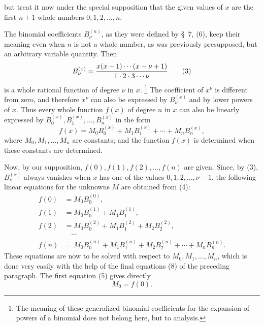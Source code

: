 
but treat it now under the special supposition that the given values of $x$ are the first $n+1$ whole numbers $0,1,2,\ldots,n$.

The binomial coefficients $B_\nu^{(n)}$, as they were defined by \S~7, (6), keep their meaning even when $n$ is not a whole number, as was previously presupposed, but an arbitrary variable quantity. Then
\begin{equation}
 B_\nu^{(x)}={x(x-1)\cdots(x-\nu+1)\over 1\cdot2\cdot3\cdots\nu}
\tag{3}
\end{equation}
is a whole rational function of degree $\nu$ in $x$.
\footnote{The meaning of these generalized binomial coefficients for the expansion of powers of a binomial does not belong here, but to analysis.}
The coefficient of $x^\nu$ is different from zero, and therefore $x^\nu$ can also be expressed by $B_\nu^{(x)}$ and by lower powers of $x$. Thus every whole function $f(x)$ of degree $n$ in $x$ can also be linearly expressed by $B_0^{(x)},B_1^{(x)},\ldots,B_n^{(x)}$ in the form
\begin{equation}
 f(x)=M_0B_0^{(x)}+M_1B_1^{(x)}+\cdots+M_nB_n^{(x)},
\tag{4}
\end{equation}
where $M_0,M_1,\ldots,M_n$ are constants; and the function $f(x)$ is determined when these constants are determined.

Now, by our supposition, $f(0),f(1),f(2),\ldots,f(n)$ are given. Since, by (3), $B_\nu^{(x)}$ always vanishes when $x$ has one of the values $0,1,2,\ldots,\nu-1$, the following linear equations for the unknowns $M$ are obtained from (4):
\begin{equation}
\begin{aligned}
 f(0)&=M_0B_0^{(0)},\\
 f(1)&=M_0B_0^{(1)}+M_1B_1^{(1)},\\
 f(2)&=M_0B_0^{(2)}+M_1B_1^{(2)}+M_2B_2^{(2)},\\
 &\quad\cdots\\
 f(n)&=M_0B_0^{(n)}+M_1B_1^{(n)}+M_2B_2^{(n)}+\cdots+M_nB_n^{(n)}.
\end{aligned}
\tag{5}
\end{equation}
These equations are now to be solved with respect to $M_0,M_1,\ldots,M_n$, which is done very easily with the help of the final equations (8) of the preceding paragraph. The first equation (5) gives directly
\begin{equation}
 M_0=f(0).
\tag{6}
\end{equation}

